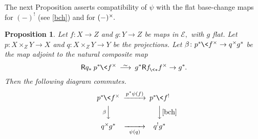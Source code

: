 \documentclass{compositio}
\theoremstyle{plain}
\newtheorem{prop}[thm]{Proposition}
\theoremstyle{definition}
\theoremstyle{remark}
\numberwithin{equation}{thm}
\begin{document}
\smallskip
The next Proposition asserts compatibility of $\psi$ with the flat base-change maps for $(-)^!$ (see \eqref{bch}) and for $(-)^\times{\mkern-1mu}.$

\begin{prop}\label{base change} 
Let\/ $f\colon X\to Z$ and\/ $g\colon Y\to Z$ be maps in\/ ${\mathscr{E}},$ with $g$ flat. 
Let\/ $p\colon X\times_Z Y\to X$ and $q\colon X\times_Z Y\to Y$ be the projections. Let $\beta\colon p^*{\mkern-1mu}\<f^\times\to q^\times{\mkern-1mu} g^*$ be the map adjoint to the natural composite map\/ 
\[{\mathsf R} q_*\>p^*{\mkern-1mu}\<f^\times{{\mkern8mu\longrightarrow \mkern-25.5mu{}^\sim\mkern17mu}} g^*{\mathsf R}{{f^{}_{{\mkern-1mu}\<*}}} f^\times\to g^*{\mkern-1mu}.
\]
Then the following diagram commutes.
\[
\CD
p^*{\mkern-1mu}\<f^\times @>p^*\psi(f)>> p^*{\mkern-1mu}\<f^!\\
@V\beta VV @VV\eqref{bch}V \\
q^\times{\mkern-1mu} g^* @>>\psi(q)> q^!g^*
\endCD
\]
\end{prop}
\end{document}
